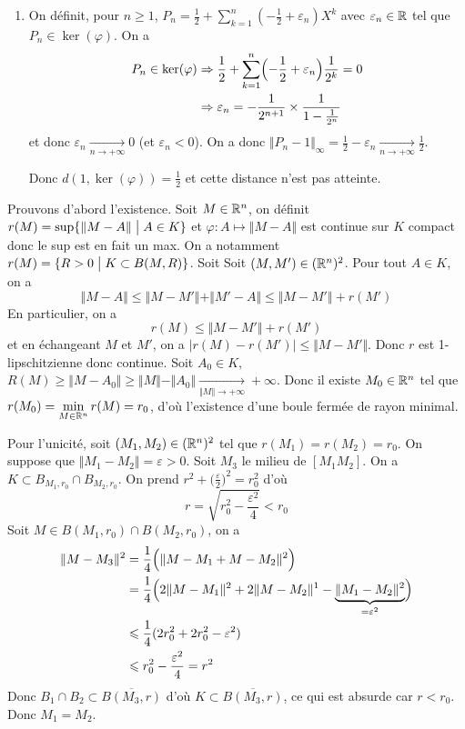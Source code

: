 \begin{solution}
\begin{enumerate}
		\item On définit, pour $n\geqslant1$, $P_{n}=\frac{1}{2}+\sum_{k=1}^{n}(-\frac{1}{2}+\varepsilon_{n})X^{k}$ avec $\varepsilon_{n}\in\mathbb{R}$ tel que $P_{n}\in\ker(\varphi)$. On a 
		\begin{align*}
			P_{n}\in\ker(\varphi)
			&\Rightarrow\frac{1}{2}+\sum_{k=1}^{n}\Bigl(-\frac{1}{2}+\varepsilon_{n}\Bigr)\frac{1}{2^{k}}=0\\
			&\Rightarrow\varepsilon_{n}=-\frac{1}{2^{n+1}}\times \frac{1}{1-\frac{1}{2^{n}}}
		\end{align*}
		et donc $\varepsilon_{n}\xrightarrow[n\to+\infty]{}0$ (et $\varepsilon_{n}<0$). On a donc $\Vert P_{n}-1\Vert_{\infty}=\frac{1}{2}-\varepsilon_{n}\xrightarrow[n\to+\infty]{}\frac{1}{2}$.

		Donc $d(1,\ker(\varphi))=\frac{1}{2}$ et cette distance n'est pas atteinte.
	\end{enumerate}
\end{solution}

\begin{solution}
	Prouvons d'abord l'existence. Soit $M\in\mathbb{R}^{n}$, on définit $r(M)=\sup\{\Vert M-A\Vert\bigm| A\in K\}$ et $\varphi\colon A\mapsto\Vert M-A\Vert$ est continue sur $K$ compact donc le sup est en fait un max. On a notamment $r(M)=\{R>0\bigm| K\subset B(M,R)\}$. Soit 
	Soit $(M,M')\in(\mathbb{R}^{n})^{2}$. Pour tout $A\in K$, on a 
	$$\Vert M-A\Vert\leqslant\Vert M-M'\Vert+\Vert M'-A\Vert\leqslant\Vert M-M'\Vert +r(M')$$
	En particulier, on a
	$$r(M)\leqslant\Vert M-M'\Vert+r(M')$$
	et en échangeant $M$ et $M'$, on a $\vert r(M)-r(M')\vert\leqslant\Vert M-M'\Vert$. Donc $r$ est 1-lipschitzienne donc continue. Soit $A_{0}\in K$, $R(M)\geqslant\Vert M-A_{0}\Vert\geqslant\Vert M\Vert-\Vert A_{0}\Vert\xrightarrow[\Vert M\Vert\to+\infty]{}+\infty$. Donc il existe $M_{0}\in\mathbb{R}^{n}$ tel que $r(M_{0})=\min\limits_{M\in\mathbb{R}^{n}}r(M)=r_{0}$, d'où l'existence d'une boule fermée de rayon minimal.

	Pour l'unicité, soit $(M_{1},M_{2})\in(\mathbb{R}^{n})^{2}$ tel que $r(M_{1})=r(M_{2})=r_{0}$. On suppose que $\Vert M_{1}-M_{2}\Vert=\varepsilon>0$. Soit $M_{3}$ le milieu de $[M_{1}M_{2}]$. On a $K\subset B_{M_{1},r_{0}}\cap B_{M_{2},r_{0}}$. On prend $r^{2}+\bigl(\frac{\varepsilon}{2}\bigr)^{2}=r_{0}^{2}$ d'où 
	$$r=\sqrt{r_{0}^{2}-\frac{\varepsilon^{2}}{4}}<r_{0}$$
	Soit $M\in B(M_{1},r_{0})\cap B(M_{2},r_{0})$, on a 
	\begin{align*}
		\Vert M-M_{3}\Vert^{2}
		&=\frac{1}{4}\Bigl(\Vert M-M_{1}+M-M_{2}\Vert^{2}\Bigr)\\
		&=\frac{1}{4}\Bigl(2\Vert M-M_{1}\Vert^{2}+2\Vert M-M_{2}\Vert^{1}-\underbrace{\Vert M_{1}-M_{2}\Vert^{2}}_{=\varepsilon^{2}}\Bigr)\\
		&\leqslant\frac{1}{4}(2r_{0}^{2}+2r_{0}^{2}-\varepsilon^{2})\\
		&\leqslant r_{0}^{2}-\frac{\varepsilon^{2}}{4}=r^{2}
	\end{align*}
	Donc $B_{1}\cap B_{2}\subset\overline{B(M_{3},r)}$ d'où $K\subset\overline{B(M_{3},r)}$, ce qui est absurde car $r<r_{0}$. Donc $M_{1}=M_{2}$.
\end{solution}


